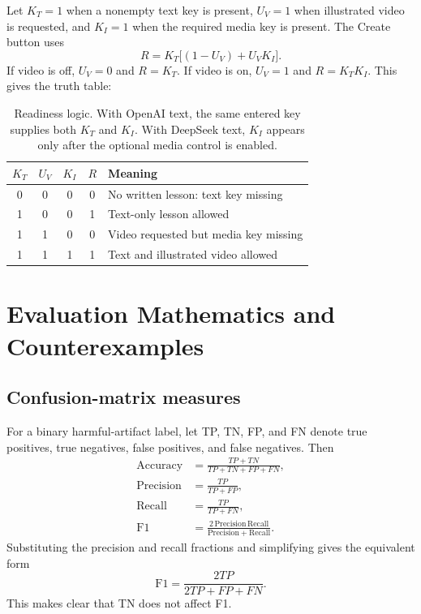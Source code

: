 \documentclass[11pt]{article}
\theoremstyle{plain}
\theoremstyle{definition}
\begin{document}
Let $K_T=1$ when a nonempty text key is present, $U_V=1$ when illustrated video is requested, and $K_I=1$ when the required media key is present. The Create button uses
\begin{equation}
R=K_T\bigl[(1-U_V)+U_VK_I\bigr].
\label{eq:key-ready}
\end{equation}
If video is off, $U_V=0$ and $R=K_T$. If video is on, $U_V=1$ and $R=K_TK_I$. This gives the truth table:

\begin{table}[H]
\centering
\begin{tabular}{@{}ccccl@{}}
\toprule
$K_T$ & $U_V$ & $K_I$ & $R$ & Meaning \\
\midrule
0 & 0 & 0 & 0 & No written lesson: text key missing \\
1 & 0 & 0 & 1 & Text-only lesson allowed \\
1 & 1 & 0 & 0 & Video requested but media key missing \\
1 & 1 & 1 & 1 & Text and illustrated video allowed \\
\bottomrule
\end{tabular}
\caption{Readiness logic. With OpenAI text, the same entered key supplies both $K_T$ and $K_I$. With DeepSeek text, $K_I$ appears only after the optional media control is enabled.}
\end{table}

\section{Evaluation Mathematics and Counterexamples}

\subsection{Confusion-matrix measures}

For a binary harmful-artifact label, let TP, TN, FP, and FN denote true positives, true negatives, false positives, and false negatives. Then
\begin{align}
\mathrm{Accuracy}&=\frac{TP+TN}{TP+TN+FP+FN},\\
\mathrm{Precision}&=\frac{TP}{TP+FP},\\
\mathrm{Recall}&=\frac{TP}{TP+FN},\\
\mathrm{F1}&=\frac{2\,\mathrm{Precision}\,\mathrm{Recall}}{\mathrm{Precision}+\mathrm{Recall}}.
\end{align}
Substituting the precision and recall fractions and simplifying gives the equivalent form
\begin{equation}
\mathrm{F1}=\frac{2TP}{2TP+FP+FN}.
\end{equation}
This makes clear that TN does not affect F1.
\end{document}
